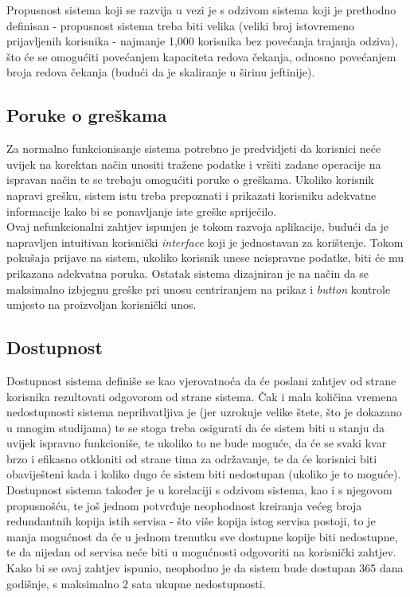 \documentclass[12pt,a4paper]{article}
\begin{document}
Propusnost sistema koji se razvija u vezi je s odzivom sistema koji je prethodno definisan - propusnost sistema treba biti velika (veliki broj istovremeno prijavljenih korisnika - najmanje 1,000 korisnika bez povećanja trajanja odziva), što će se omogućiti povećanjem kapaciteta redova čekanja, odnosno povećanjem broja redova čekanja (budući da je skaliranje u širinu jeftinije).

\subsection{Poruke o greškama}

\quad Za normalno funkcionisanje sistema potrebno je predvidjeti da korisnici neće uvijek na korektan način unositi tražene podatke i vršiti zadane operacije na ispravan način te se trebaju omogućiti poruke o greškama. Ukoliko korisnik napravi grešku, sistem istu treba prepoznati i prikazati korisniku adekvatne informacije kako bi se ponavljanje iste greške spriječilo. \\

Ovaj nefunkcionalni zahtjev ispunjen je tokom razvoja aplikacije, budući da je napravljen intuitivan korisnički \textit{interface} koji je jednostavan za korištenje. Tokom pokušaja prijave na sistem, ukoliko korisnik unese neispravne podatke, biti će mu prikazana adekvatna poruka. Ostatak sistema dizajniran je na način da se maksimalno izbjegnu greške pri unosu centriranjem na prikaz i \textit{button} kontrole umjesto na proizvoljan korisnički unos.

\subsection{Dostupnost}

\quad Dostupnost sistema definiše se kao vjerovatnoća da će poslani zahtjev od strane korisnika rezultovati odgovorom od strane sistema. Čak i mala količina vremena nedostupnosti sistema neprihvatljiva je (jer uzrokuje velike štete, što je dokazano u mnogim studijama) te se stoga treba osigurati da će sistem biti u stanju da uvijek ispravno funkcioniše, te ukoliko to ne bude moguće, da će se svaki kvar brzo i efikasno otkloniti od strane tima za održavanje, te da će korisnici biti obaviješteni kada i koliko dugo će sistem biti nedostupan (ukoliko je to moguće). \\

Dostupnost sistema također je u korelaciji s odzivom sistema, kao i s njegovom propusnošću, te još jednom potvrđuje neophodnost kreiranja većeg broja redundantnih kopija istih servisa - što više kopija istog servisa postoji, to je manja mogućnost da će u jednom trenutku sve dostupne kopije biti nedostupne, te da nijedan od servisa neće biti u mogućnosti odgovoriti na korisnički zahtjev. Kako bi se ovaj zahtjev ispunio, neophodno je da sistem bude dostupan 365 dana godišnje, s maksimalno 2 sata ukupne nedostupnosti.
\end{document}
